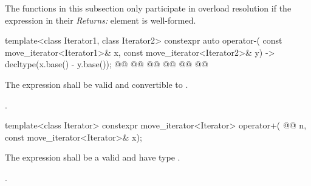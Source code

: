 {\color{oldclr}
\pnum
The functions in this subsection only participate in overload resolution if the
expression in their \textit{Returns:} element is well-formed.
} %

%
\begin{itemdecl}
template<class Iterator1, class Iterator2>
  constexpr auto operator-(
    const move_iterator<Iterator1>& x,
    const move_iterator<Iterator2>& y) -> decltype(x.base() - y.base());
@@
@@
    @@
@@
@@
    @@
\end{itemdecl}

\begin{itemdescr}
{\color{newclr}
\pnum
\constraints
The expression  shall be valid and
convertible to .
} %

\pnum
\returns {}.
\end{itemdescr}

%
\begin{itemdecl}
template<class Iterator>
  constexpr move_iterator<Iterator> operator+(
    @@ n,
    const move_iterator<Iterator>& x);
\end{itemdecl}

\begin{itemdescr}
{\color{newclr}
\pnum
\constraints
The expression  shall be a valid and
have type .
} %

\pnum
\returns {}.
\end{itemdescr}

